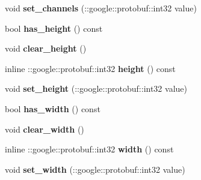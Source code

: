 \begin{DoxyCompactItemize}
void {\bfseries set\+\_\+channels} (\+::google\+::protobuf\+::int32 value)
\item 
\mbox{\label{classcaffe_1_1_blob_proto_a36fd1f9d4d130455ffa04671e1e09c6a}} 
bool {\bfseries has\+\_\+height} () const
\item 
\mbox{\label{classcaffe_1_1_blob_proto_a95ff41c9f5c25cd1adb348817a4f3ce8}} 
void {\bfseries clear\+\_\+height} ()
\item 
\mbox{\label{classcaffe_1_1_blob_proto_a53660b47fd3154068a86b4b9444200f2}} 
inline \+::google\+::protobuf\+::int32 {\bfseries height} () const
\item 
\mbox{\label{classcaffe_1_1_blob_proto_a4131984cbda6814fb3afcd444f0d7a0a}} 
void {\bfseries set\+\_\+height} (\+::google\+::protobuf\+::int32 value)
\item 
\mbox{\label{classcaffe_1_1_blob_proto_abbf33d599c60a277fd9f20b9f826aea6}} 
bool {\bfseries has\+\_\+width} () const
\item 
\mbox{\label{classcaffe_1_1_blob_proto_acf816f62470e9bd548a082a978653069}} 
void {\bfseries clear\+\_\+width} ()
\item 
\mbox{\label{classcaffe_1_1_blob_proto_a6a0d5e3754919c42949b83002336b3ed}} 
inline \+::google\+::protobuf\+::int32 {\bfseries width} () const
\item 
\mbox{\label{classcaffe_1_1_blob_proto_a55c4bff79ea79db11f9adce618f3f1ed}} 
void {\bfseries set\+\_\+width} (\+::google\+::protobuf\+::int32 value)
\end{DoxyCompactItemize}
